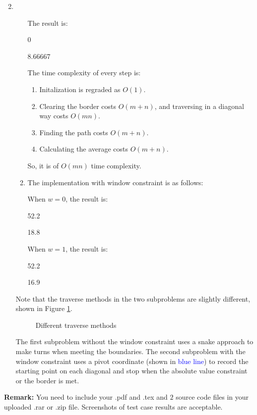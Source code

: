 \documentclass[12pt,a4paper]{article}
\makeatletter
\newtheorem*{solution}{Solution}
\theoremstyle{definition}
\renewenvironment{solution}[1][Solution] {\par\pushQED{\qed}\normalfont\topsep6\p@\@plus6\p@\relax\trivlist\item[\hskip\labelsep\bfseries#1\@addpunct{.}]\ignorespaces}{\popQED\endtrivlist\@endpefalse} \makeatother
\providecommand{\code}[2]{}
\makeatother
\begin{document}
\begin{enumerate}
\begin{solution}
\begin{enumerate}
				The result is:
				\begin{tcolorbox}
					0

					8.66667
				\end{tcolorbox}

				The time complexity of every step is:
				\begin{enumerate}
					\item Initalization is regraded as $O(1)$.
					\item Clearing the border costs $O(m+n)$, and traversing in a diagonal way costs $O(mn)$.
					\item Finding the path costs $O(m+n)$.
					\item Calculating the average costs $O(m+n)$. 
				\end{enumerate}
				So, it is of $O(mn)$ time complexity.
				\item The implementation with window constraint is as follows:
				\code{Code-DTWW.cpp}{c++}

				When $w=0$, the result is:
				\begin{tcolorbox}
					52.2

					18.8
				\end{tcolorbox}

				When $w=1$, the result is:
				\begin{tcolorbox}
					52.2

					16.9
				\end{tcolorbox}
			\end{enumerate}

			Note that the traverse methods in the two subproblems are slightly different, shown in Figure \ref{fig:trav}.
			
			\begin{figure}[H]
				\centering
				\hspace{1em}
				\caption{Different traverse methods}
				\label{fig:trav}
			\end{figure}

			The first subproblem without the window constraint uses a snake approach to make turns when meeting the boundaries. The second subproblem with the window constraint uses a pivot coordinate (shown in \textcolor{blue}{blue line}) to record the starting point on each diagonal and stop when the absolute value constraint or the border is met.
		\end{solution}
		
	\end{enumerate}
	
	\vspace{20pt}
	
	\textbf{Remark:} You need to include your .pdf and .tex and {\color{red}\emph{$2$}} source code files in your uploaded .rar or .zip file. Screenshots of test case results are acceptable.
	
\end{document}
